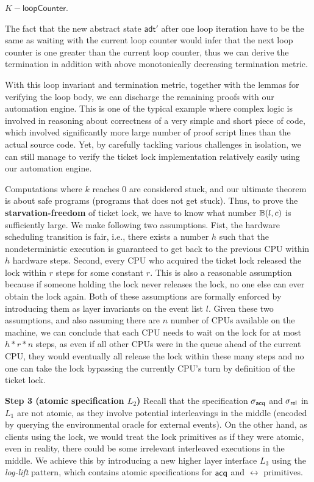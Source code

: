 \begin{definition} $K - \textsf{loopCounter}$.
\end{definition}

The fact that the new abstract state $\textsf{adt}'$ after one loop iteration have to be the same as
waiting with the current loop counter would infer that the next loop counter is one greater than the current
loop counter, thus we can derive the termination in addition with above monotonically decreasing termination
metric.

With this loop invariant and termination metric, together with the lemmas for verifying the loop body,
we can discharge the remaining proofs with our automation engine. 
This is one of the typical example where complex logic is involved in reasoning about correctness
of a very simple and short piece of code, which involved significantly more large number of proof
script lines than the actual source code. Yet, by carefully tackling various challenges in isolation, we
can still manage to verify the ticket lock implementation relatively easily using our automation engine.


Computations where $k$ reaches 0 are considered stuck, and our
ultimate theorem is about safe programs (programs that does not get stuck).
Thus, to prove the \textbf{starvation-freedom} of ticket lock,
we have to know what number $\mathbb{B}(l,c)$ is sufficiently large.
We make following two assumptions. Fist, the hardware scheduling transition
is fair, i.e., there exists a number $h$ such that the nondeterministic execution is
guaranteed to get back to the previous CPU within $h$ hardware steps.
Second, every CPU who acquired the ticket lock released the lock within
$r$ steps for some constant $r$. This is also a reasonable assumption because if someone
holding the lock never releases the lock, no one else can ever obtain the lock
again. Both of these assumptions are formally enforced by introducing
them as layer invariants on the event list $l$.
Given these two assumptions, and also assuming there are $n$ number
of CPUs available on the machine, we can conclude that each CPU
needs to wait on the lock for at most $h * r * n$ steps, as even if all
other CPUs were in the queue ahead of the current CPU, they would eventually
all release the lock within these many steps and no one can take the lock
bypassing the currently CPU's turn by definition of the ticket lock.



\vspace{3pt}
\noindent\textbf{Step 3 (atomic specification $L_2$)}
Recall that the specification $\sigma_{\mathsf{acq}}$ and $\sigma_{\mathsf{rel}}$ in $L_1$
are not atomic, as they involve potential interleavings in the middle
(encoded by querying the environmental oracle for external events).
On the other hand, as clients using the lock, we would treat the lock
primitives as if they were atomic, even in reality, there could be
some irrelevant interleaved executions in the middle.
We achieve this by introducing a new higher layer interface $L_3$ using
the \emph{log-lift} pattern, which contains atomic specifications
for $\mathsf{acq}$ and $\rel$ primitives.

